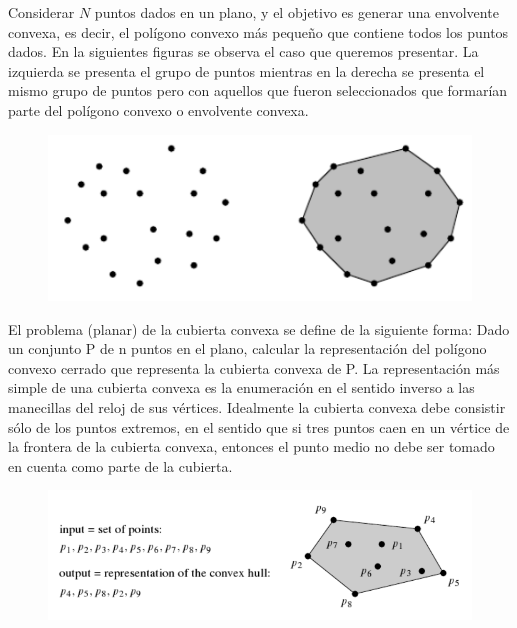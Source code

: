 Considerar $N$ puntos dados en un plano, y el objetivo es generar una envolvente convexa, es decir, el polígono convexo más pequeño que contiene todos los puntos dados. En la siguientes figuras se observa el caso que queremos presentar. La izquierda se presenta el grupo de puntos mientras en la derecha se presenta el mismo grupo de puntos pero con aquellos que fueron seleccionados que formarían parte del polígono convexo o envolvente convexa.

\begin{figure}[!h]
	\centering
	\includegraphics[scale=0.4]{img/cubierta_convexa}
	\label{fig:cubiertaconvexa}
\end{figure}

El problema (planar) de la cubierta convexa se define de la siguiente forma: Dado un conjunto P de n puntos en el plano, calcular la representación del polígono convexo cerrado que representa la cubierta convexa de P. La representación más simple de una cubierta convexa es la enumeración en el sentido inverso a las manecillas del reloj de sus vértices. Idealmente la cubierta convexa debe consistir sólo de los puntos extremos, en el sentido que si tres puntos caen en un vértice de la frontera de la cubierta convexa, entonces el punto medio no debe ser tomado en cuenta como parte de la cubierta. 

\begin{figure}[h]
	\centering
	\includegraphics[scale=0.35]{img/cubierta_convexa2}
\end{figure}